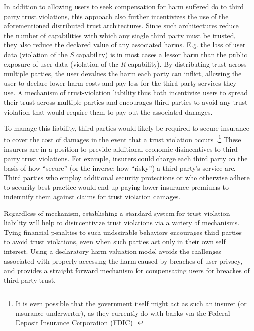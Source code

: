 In addition to allowing users to seek compensation for harm suffered
do to third party trust violations, this approach also further
incentivizes the use of the aforementioned distributed trust
architectures. Since such architectures reduce the number of
capabilities with which any single third party must be trusted, they
also reduce the declared value of any associated harms. E.g. the loss
of user data (violation of the \emph{S} capability) is in most cases a
lessor harm than the public exposure of user data (violation of the
\emph{R} capability). By distributing trust across multiple parties,
the user devalues the harm each party can inflict, allowing the user
to declare lower harm costs and pay less for the third party services
they use. A mechanism of trust-violation liability thus both
incentivize users to spread their trust across multiple parties and
encourages third parties to avoid any trust violation that would
require them to pay out the associated damages.

To manage this liability, third parties would likely be required to
secure insurance to cover the cost of damages in the event that a
trust violation occurs~\cite{ciab2015, starks2016}.\footnote{It is
  even possible that the government itself might act as such an
  insurer (or insurance underwriter), as they currently do with banks
  via the Federal Deposit Insurance Corporation (FDIC)~\cite{fdic}.}
These insurers are in a position to provide additional economic
disincentives to third party trust violations. For example, insurers
could charge each third party on the basis of how ``secure'' (or the
inverse: how ``risky'') a third party's service are. Third parties who
employ additional security protections or who otherwise adhere to
security best practice would end up paying lower insurance premiums to
indemnify them against claims for trust violation damages.

Regardless of mechanism, establishing a standard system for trust
violation liability will help to disincentivize trust violations via a
variety of mechanisms. Tying financial penalties to such undesirable
behaviors encourages third parties to avoid trust violations, even
when such parties act only in their own self interest. Using a
declaratory harm valuation model avoids the challenges associated with
properly accessing the harm caused by breaches of user privacy, and
provides a straight forward mechanism for compensating users for
breaches of third party trust.

